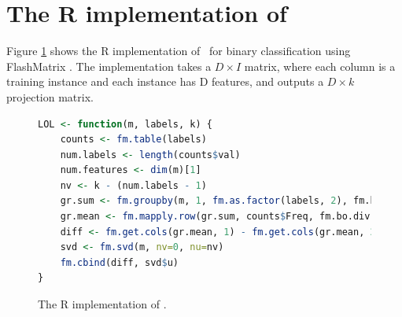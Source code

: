 \documentclass[11pt]{extarticle}
\begin{document}
\section{The R implementation of \Lol}

Figure \ref{Rimpl} shows the R implementation of \Lol~for binary classification
using FlashMatrix \cite{FlashMatrix}. The implementation takes a $D \times I$
matrix, where each column is a training instance and each instance has D
features, and outputs a $D \times k$ projection matrix.

\begin{figure}[h!]
\begin{lstlisting}[language=R]
LOL <- function(m, labels, k) {
	counts <- fm.table(labels)
	num.labels <- length(counts$val)
	num.features <- dim(m)[1]
	nv <- k - (num.labels - 1)
	gr.sum <- fm.groupby(m, 1, fm.as.factor(labels, 2), fm.bo.add)
	gr.mean <- fm.mapply.row(gr.sum, counts$Freq, fm.bo.div, FALSE)
	diff <- fm.get.cols(gr.mean, 1) - fm.get.cols(gr.mean, 2)
	svd <- fm.svd(m, nv=0, nu=nv)
	fm.cbind(diff, svd$u)
}
\end{lstlisting}
\caption{The R implementation of \Lol.}
\label{Rimpl}
\end{figure}







\end{document}
